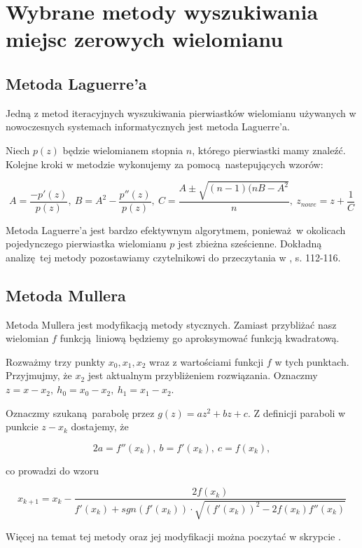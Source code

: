 \documentclass{article}
\begin{document}
\lstset{language=Haskell, label=DescriptiveLabel, frame=shadowbox}


\section{Wybrane metody wyszukiwania miejsc zerowych wielomianu}

\subsection{Metoda Laguerre'a}

Jedną z metod iteracyjnych wyszukiwania pierwiastków wielomianu używanych w nowoczesnych systemach informatycznych jest metoda Laguerre'a. 

Niech $p(z)$ będzie wielomianem stopnia $n$, którego pierwiastki mamy znaleźć. Kolejne kroki w metodzie wykonujemy za pomocą nastepujących wzorów:

$$ A = \frac{-p'(z)}{p(z)}, \ B = A^2 - \frac{p''(z)}{p(z)}, \ C = \frac{A \pm \sqrt{(n-1)(nB - A^2}}{n}, \ z_{nowe} = z + \frac{1}{C}$$ 

Metoda Laguerre'a jest bardzo efektywnym algorytmem, ponieważ w okolicach pojedynczego pierwiastka wielomianu $p$ jest zbieżna sześcienne. Dokładną analizę tej metody pozostawiamy czytelnikowi do przeczytania w \cite{kincaid}, s. 112-116.

\subsection{Metoda Mullera}

Metoda Mullera jest modyfikacją metody stycznych. Zamiast przybliżać nasz wielomian $f$ funkcją liniową będziemy go aproksymować funkcją kwadratową.

Rozważmy trzy punkty $x_0, x_1, x_2$ wraz z wartościami funkcji $f$ w tych punktach. Przyjmujmy, że $x_2$ jest aktualnym przybliżeniem rozwiązania. Oznaczmy $z = x-x_2, \ h_0 = x_0 - x_2, \ h_1 = x_1-x_2$.

Oznaczmy szukaną parabolę przez $g(z) = az^2 + bz + c$. Z definicji paraboli w punkcie $z - x_k$ dostajemy, że 

$$2a = f''(x_k), \ b = f'(x_k), \ c = f(x_k),$$

co prowadzi do wzoru

$$x_{k+1} = x_k - \frac{2f(x_k)}{f'(x_k) + sgn(f'(x_k)) \cdot \sqrt{(f'(x_k))^2 - 2f(x_k)f''(x_k)}}$$

Więcej na temat tej metody oraz jej modyfikacji można poczytać w skrypcie \cite{tajewski}.
\end{document}
